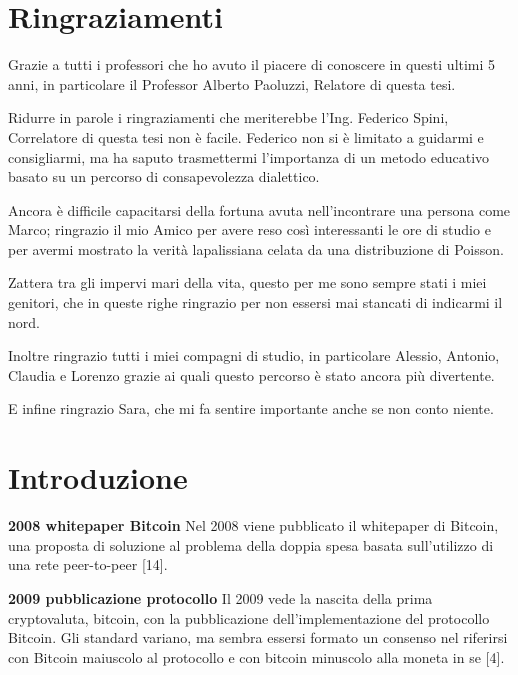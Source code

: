 \documentclass[12pt,italian,]{book}
\begin{document}
\chapter*{Ringraziamenti}
\small{
Grazie a tutti i professori che ho avuto il piacere di conoscere in questi ultimi 5 anni, in particolare il Professor Alberto Paoluzzi, Relatore di questa tesi.

Ridurre in parole i ringraziamenti che meriterebbe l'Ing. Federico Spini, Correlatore di questa tesi non è facile. Federico non si è limitato a guidarmi e consigliarmi, ma ha saputo trasmettermi l'importanza di un metodo educativo basato su un percorso di consapevolezza dialettico.

Ancora è difficile capacitarsi della fortuna avuta nell'incontrare una persona come Marco; ringrazio il mio Amico per avere reso così interessanti le ore di studio e per avermi mostrato la verità lapalissiana celata da una distribuzione di Poisson.

Zattera tra gli impervi mari della vita, questo per me sono sempre stati i miei genitori, che in queste righe ringrazio per non essersi mai stancati di indicarmi il nord.

Inoltre ringrazio tutti i miei compagni di studio, in particolare Alessio, Antonio, Claudia e Lorenzo grazie ai quali questo percorso è stato ancora più divertente.

E infine ringrazio Sara, che mi fa sentire importante anche se non conto niente.
}

\setcounter{tocdepth}{2}
\tableofcontents

\listoftables

\listoffigures



\hypertarget{introduzione}{%
\chapter{Introduzione}\label{introduzione}}

\textbf{2008 whitepaper Bitcoin} Nel 2008 viene pubblicato il whitepaper di Bitcoin, una proposta di soluzione al problema della doppia spesa basata sull'utilizzo di una rete peer-to-peer {[}14{]}.

\textbf{\textbf{2009 pubblicazione protocollo}} Il 2009 vede la nascita della prima cryptovaluta, bitcoin, con la pubblicazione
dell'implementazione del protocollo Bitcoin. Gli standard variano, ma sembra
essersi formato un consenso nel riferirsi con Bitcoin maiuscolo al
protocollo e con bitcoin minuscolo alla moneta in se {[}4{]}.
\end{document}
